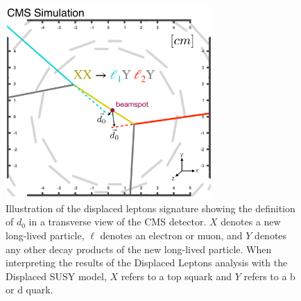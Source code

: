 \begin{figure}
\centering
\includegraphics[width=0.7\textwidth]{figures/overview/signalEventDisplay.pdf}
\caption{Illustration of the displaced leptons signature showing the definition of $d_0$ in a transverse view of the CMS detector. $X$ denotes a new long-lived particle, $\ell$ denotes an electron or muon, and $Y$ denotes any other decay products of the new long-lived particle. When interpreting the results of the Displaced Leptons analysis with the Displaced SUSY model, $X$ refers to a top squark and $Y$ refers to a b or d quark.} 
\label{displaced_leptons_cartoon}
\end{figure}